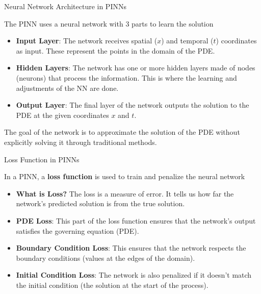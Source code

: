 \documentclass{beamer}
\begin{document}
\begin{frame}{Neural Network Architecture in PINNs}

The PINN uses a neural network with 3 parts to learn the solution

\begin{itemize}
    \item \textbf{Input Layer}: The network receives spatial (\(x\)) and temporal (\(t\)) coordinates as input. These represent the points in the domain of the PDE.\pause
    \item \textbf{Hidden Layers}: The network has one or more hidden layers made of nodes (neurons) that process the information. This is where the learning and adjustments of the NN are done.\pause
    \item \textbf{Output Layer}: The final layer of the network outputs the solution to the PDE at the given coordinates \(x\) and \(t\).
\end{itemize}

The goal of the network is to approximate the solution of the PDE without explicitly solving it through traditional methods.

\end{frame}

\begin{frame}{Loss Function in PINNs}

In a PINN, a \textbf{loss function} is used to train and penalize the neural network

\begin{itemize}
    \item \textbf{What is Loss?} The loss is a measure of error. It tells us how far the network's predicted solution is from the true solution.\pause
    \item \textbf{PDE Loss}: This part of the loss function ensures that the network's output satisfies the governing equation (PDE).\pause
    \item \textbf{Boundary Condition Loss}: This ensures that the network respects the boundary conditions (values at the edges of the domain).\pause
    \item \textbf{Initial Condition Loss}: The network is also penalized if it doesn't match the initial condition (the solution at the start of the process).
\end{itemize}
\end{frame}
\end{document}

